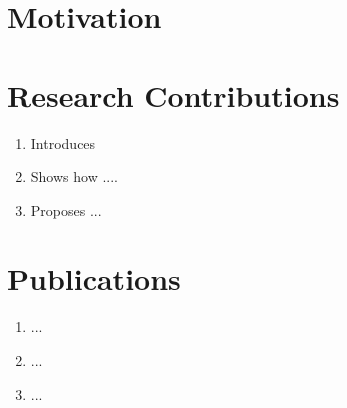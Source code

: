 \section{Motivation}


\section{Research Contributions}


\begin{enumerate}

    \item Introduces
    \item Shows how ....
    \item Proposes ...

\end{enumerate}



\section{Publications}

\begin{enumerate}
    \item ...

    \item ...

    \item ...

\end{enumerate}
\cleardoublepage
